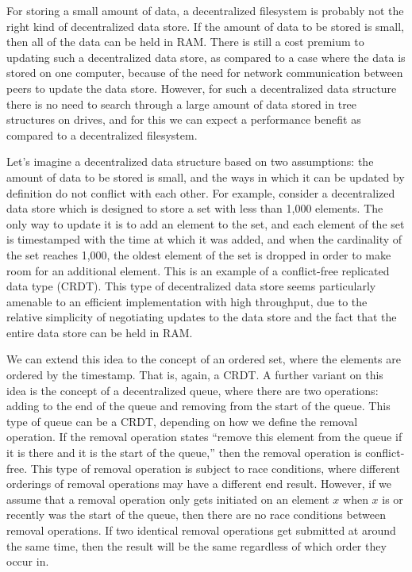 \documentclass[12pt]{article}
\begin{document}
For storing a small amount of data, a decentralized filesystem is probably not the right kind of decentralized data store. If the amount of data to be stored is small, then all of the data can be held in RAM. There is still a cost premium to updating such a decentralized data store, as compared to a case where the data is stored on one computer, because of the need for network communication between peers to update the data store. However, for such a decentralized data structure there is no need to search through a large amount of data stored in tree structures on drives, and for this we can expect a performance benefit as compared to a decentralized filesystem.

Let's imagine a decentralized data structure based on two assumptions: the amount of data to be stored is small, and the ways in which it can be updated by definition do not conflict with each other. For example, consider a decentralized data store which is designed to store a set with less than 1,000 elements. The only way to update it is to add an element to the set, and each element of the set is timestamped with the time at which it was added, and when the cardinality of the set reaches 1,000, the oldest element of the set is dropped in order to make room for an additional element. This is an example of a conflict-free replicated data type (CRDT). This type of decentralized data store seems particularly amenable to an efficient implementation with high throughput, due to the relative simplicity of negotiating updates to the data store and the fact that the entire data store can be held in RAM.

We can extend this idea to the concept of an ordered set, where the elements are ordered by the timestamp. That is, again, a CRDT. A further variant on this idea is the concept of a decentralized queue, where there are two operations: adding to the end of the queue and removing from the start of the queue. This type of queue can be a CRDT, depending on how we define the removal operation. If the removal operation states ``remove this element from the queue if it is there and it is the start of the queue,'' then the removal operation is conflict-free. This type of removal operation is subject to race conditions, where different orderings of removal operations may have a different end result. However, if we assume that a removal operation only gets initiated on an element $x$ when $x$ is or recently was the start of the queue, then there are no race conditions between removal operations. If two identical removal operations get submitted at around the same time, then the result will be the same regardless of which order they occur in.
\end{document}
